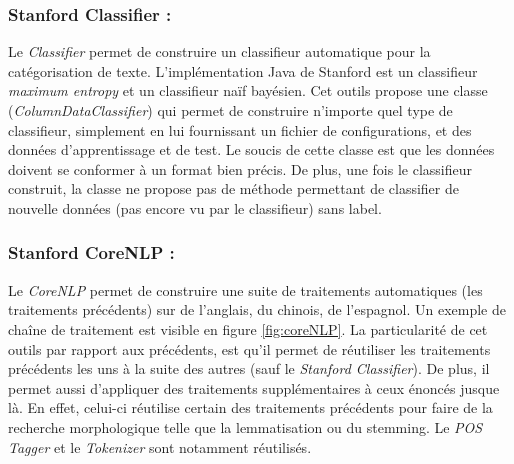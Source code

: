             \subsubsection{Stanford Classifier :}
                Le \textit{Classifier} permet de construire un classifieur automatique pour la catégorisation de texte. L’implémentation Java de Stanford est un classifieur \textit{maximum entropy} et un classifieur naïf bayésien. Cet outils propose une classe (\textit{ColumnDataClassifier}) qui permet de construire n'importe quel type de classifieur, simplement en lui fournissant un fichier de configurations, et des données d'apprentissage et de test. Le soucis de cette classe est que les données doivent se conformer à un format bien précis. De plus, une fois le classifieur construit, la classe ne propose pas de méthode permettant de classifier de nouvelle données (pas encore vu par le classifieur) sans label.

            \subsubsection{Stanford CoreNLP :}
                Le \textit{CoreNLP} permet de construire une suite de traitements automatiques (les traitements précédents) sur de l'anglais, du chinois, de l'espagnol. Un exemple de chaîne de traitement est visible en figure \ref{fig:coreNLP}. La particularité de cet outils par rapport aux précédents, est qu'il permet de réutiliser les traitements précédents les uns à la suite des autres (sauf le \textit{Stanford Classifier}). De plus, il permet aussi d'appliquer des traitements supplémentaires à ceux énoncés jusque là. En effet, celui-ci réutilise certain des traitements précédents pour faire de la recherche morphologique telle que la lemmatisation ou du stemming. Le \textit{POS Tagger} et le \textit{Tokenizer} sont notamment réutilisés.


